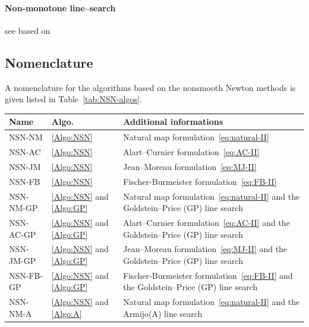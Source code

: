 \paragraph{Non-monotone line--search}

see \cite{Koziara.Bicanic_CMAME2008} based on \cite{Ferris.Lucidi_JOTA1994,Grippo.ea_SJNAAM1986}


\subsection{Nomenclature}
A nomenclature for the algorithms based on the nonsmooth Newton methods is given listed in Table~\ref{tab:NSN-algos}.
\begin{table}[htbp]
  \centering
  \begin{tabular}{|l|l|p{}|}
    \hline
    {Name}
    & Algo.
    & Additional informations
    \\
    \hline
    \hline
    \sf NSN-NM
    & \ref{Algo:NSN} 
    & Natural map formulation~\eqref{eq:natural-II}
    \\
    \hline
    \sf NSN-AC
    & \ref{Algo:NSN} 
    & Alart--Curnier formulation~\eqref{eq:AC-II}
    \\
    \hline
    \sf NSN-JM
    & \ref{Algo:NSN} 
    & Jean--Moreau formulation~\eqref{eq:MJ-II}
    \\
    \hline
    \sf NSN-FB
    & \ref{Algo:NSN}
    & Fischer-Burmeister formulation~\eqref{eq:FB-II}
    \\
    \hline
    \sf NSN-NM-GP
    & \ref{Algo:NSN} and \ref{Algo:GP}
    &  Natural map formulation~\eqref{eq:natural-II} and the Goldstein--Price (GP) line search
    \\
    \hline
    \sf NSN-AC-GP
    & \ref{Algo:NSN} and \ref{Algo:GP}
    &  Alart--Curnier formulation~\eqref{eq:AC-II} and the Goldstein--Price (GP) line search
    \\
    \hline
    \sf NSN-JM-GP
    & \ref{Algo:NSN} and \ref{Algo:GP}
    & Jean--Moreau formulation~\eqref{eq:MJ-II} and the Goldstein--Price (GP) line search
    \\
    \hline
    \sf NSN-FB-GP
    & \ref{Algo:NSN} and \ref{Algo:GP}
    & Fischer-Burmeister formulation~\eqref{eq:FB-II} and the Goldstein--Price (GP) line search
    \\
    \hline
    \sf NSN-NM-A
    & \ref{Algo:NSN} and \ref{Algo:A}
    &  Natural map formulation~\eqref{eq:natural-II} and the Armijo(A) line search

\end{tabular}
\end{table}
